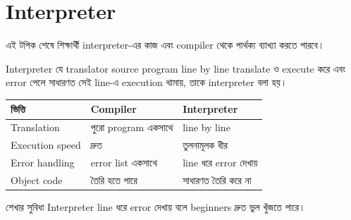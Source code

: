 \section{Interpreter}

\begin{learningbox}
এই টপিক শেষে শিক্ষার্থী interpreter-এর কাজ এবং compiler থেকে পার্থক্য ব্যাখ্যা করতে পারবে।
\end{learningbox}

\begin{definitionbox}{Interpreter}
যে translator source program line by line translate ও execute করে এবং error পেলে সাধারণত সেই line-এ execution থামায়, তাকে interpreter বলা হয়।
\end{definitionbox}

\begin{center}
\begin{tabular}{|p{}|p{}|p{}|}
\hline
\textbf{ভিত্তি} & \textbf{Compiler} & \textbf{Interpreter} \\
\hline
Translation & পুরো program একসাথে & line by line \\
\hline
Execution speed & দ্রুত & তুলনামূলক ধীর \\
\hline
Error handling & error list একসাথে & line ধরে error দেখায় \\
\hline
Object code & তৈরি হতে পারে & সাধারণত তৈরি করে না \\
\hline
\end{tabular}
\end{center}

\begin{examplebox}{শেখার সুবিধা}
Interpreter line ধরে error দেখায় বলে beginners দ্রুত ভুল খুঁজতে পারে।
\end{examplebox}
